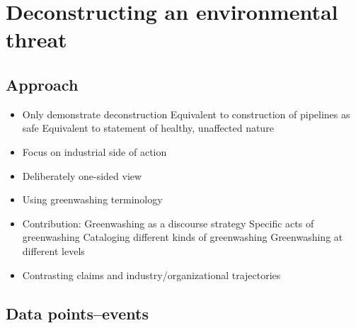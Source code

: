 
\medskip


\section*{Deconstructing an environmental threat}

\subsection*{Approach} 

\begin{itemize}
	\item Only demonstrate deconstruction
		\subitem Equivalent to construction of pipelines as safe
		\subitem Equivalent to statement of healthy, unaffected nature
	\item Focus on industrial side of action
	\item Deliberately one-sided view
	\item Using greenwashing terminology
	\item Contribution: Greenwashing as a discourse strategy
		\subitem Specific acts of greenwashing
		\subitem Cataloging different kinds of greenwashing
		\subitem Greenwashing at different levels
	\item Contrasting claims and industry/organizational trajectories
\end{itemize}

\subsection*{Data points--events}

